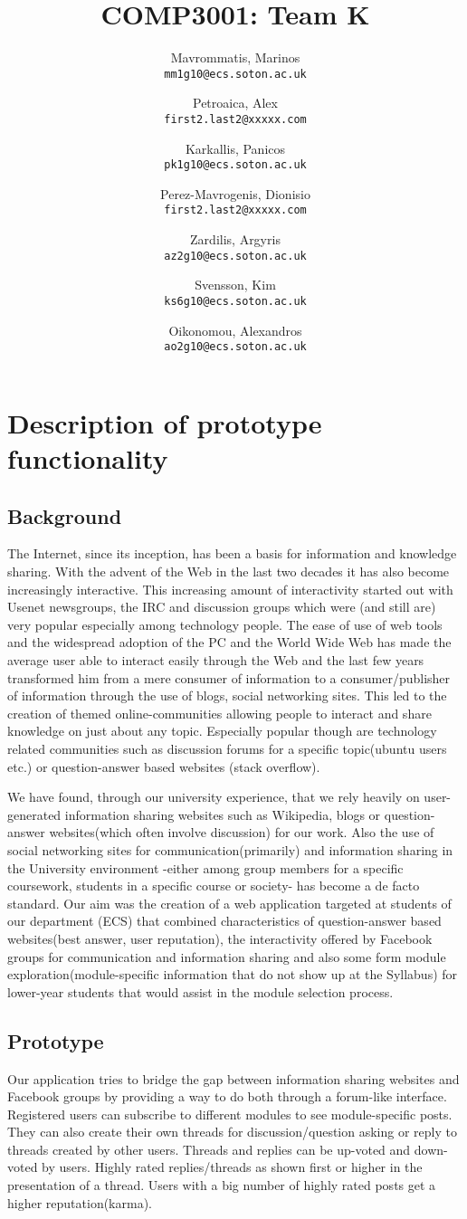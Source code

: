 \documentclass[12pt,a4paper,titlepage]{article}
\author{
  Mavrommatis, Marinos\\ 
\texttt{mm1g10@ecs.soton.ac.uk}
\and
Petroaica, Alex\\ 
\texttt{first2.last2@xxxxx.com}
\and
Karkallis, Panicos\\ 
\texttt{pk1g10@ecs.soton.ac.uk}
\and
Perez-Mavrogenis, Dionisio\\
 \texttt{first2.last2@xxxxx.com}
\and
Zardilis, Argyris\\
 \texttt{az2g10@ecs.soton.ac.uk}
\and
Svensson, Kim\\
 \texttt{ks6g10@ecs.soton.ac.uk}
\and
Oikonomou, Alexandros\\
 \texttt{ao2g10@ecs.soton.ac.uk}
}
\title{COMP3001: Team K}
\begin{document}
\maketitle

\section{Description of prototype functionality}
\subsection{Background}
The Internet, since its inception, has been a basis for information and knowledge sharing. With the advent of the Web in the last two decades it has also become increasingly interactive. This increasing amount of interactivity started out with Usenet newsgroups, the IRC and discussion groups which were (and still are) very popular especially among technology people. The ease of use of web tools and the widespread adoption of the PC and the World Wide Web has made the average user able to interact easily through the Web and the last few years transformed him from a mere consumer of information to a consumer/publisher of information through the use of blogs, social networking sites.  This led to the creation of themed online-communities allowing people to interact and share knowledge on just about any topic. Especially popular though are technology related communities such as discussion forums for a specific topic(ubuntu users etc.) or question-answer based websites (stack overflow).

We have found, through our university experience, that we rely heavily on user-generated information sharing websites such as Wikipedia, blogs or question-answer websites(which often involve discussion) for our work. Also the use of social networking sites for communication(primarily) and information sharing in the University environment -either among group members for a specific coursework, students in a specific course or society- has become a de facto standard. Our aim was the creation of a web application targeted at students of our department (ECS) that combined characteristics of question-answer based websites(best answer, user reputation), the interactivity offered by Facebook groups for communication and information sharing and also some form module exploration(module-specific information that do not show up at the Syllabus) for lower-year students that would assist in the module selection process.
\subsection{Prototype}
Our application tries to bridge the gap between information sharing websites and Facebook groups by providing a way to do both through a forum-like interface.  Registered users can subscribe to different modules to see module-specific posts. They can also create their own threads for discussion/question asking or reply to threads created by other users. Threads and replies can be up-voted and down-voted by users. Highly rated replies/threads as shown first or higher in the presentation of a thread.  Users with a big number of highly rated posts get a higher reputation(karma).
\end{document}
